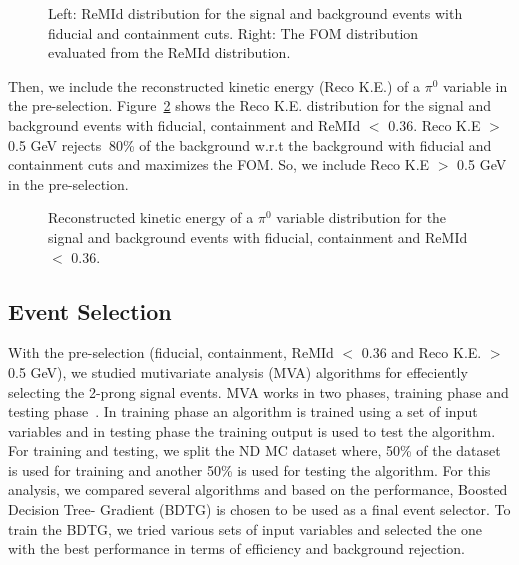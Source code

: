 \documentclass[12pt]{article}
\begin{document}
\begin{figure}[htb]
\begin{center}
\caption{Left: ReMId distribution for the signal and background events with fiducial and containment cuts. Right: The FOM distribution evaluated from the ReMId distribution.}
\label{fig:remidandfom}
\end{center}
\end{figure}

Then, we include the reconstructed kinetic energy (Reco K.E.) of a $\pi^{0}$ variable in the pre-selection.  Figure~\ref{fig:recokinen} shows the Reco K.E. distribution for the signal and background events with fiducial, containment and ReMId $<$ 0.36. Reco K.E $>$ 0.5 GeV rejects $~$80\% of the background w.r.t the background with fiducial and containment cuts and maximizes the FOM. So, we include Reco K.E $>$ 0.5 GeV in the pre-selection.

\begin{figure}[htb]
\begin{center}
\caption{Reconstructed kinetic energy of a $\pi^{0}$ variable distribution for the signal and background events with fiducial, containment and ReMId $<$ 0.36.}
\label{fig:recokinen}
\end{center}
\end{figure}

\subsection{Event Selection}

With the pre-selection (fiducial, containment, ReMId $<$ 0.36 and Reco K.E. $>$ 0.5 GeV), we studied mutivariate analysis (MVA) algorithms for effeciently selecting the 2-prong signal events. MVA works in two phases, training phase and testing phase~\cite{Hoecker}. In training phase an algorithm is trained using a set of input variables and in testing phase the training output is used to test the algorithm. For training and testing, we split the ND MC dataset where, 50\% of the dataset is used for training and another 50\% is used for testing the algorithm.  For this analysis, we compared several algorithms and based on the performance, Boosted Decision Tree- Gradient (BDTG) is chosen to be used as a final event selector. To train the BDTG, we tried various sets of input variables and selected the one with the best performance in terms of efficiency and background rejection.
\end{document}
